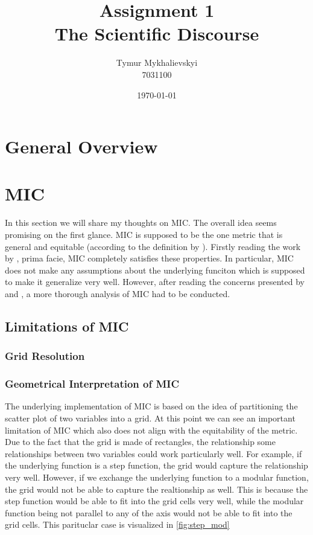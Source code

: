 \documentclass{article}
\title{\vspace{-2cm}Assignment 1\\
    The Scientific Discourse}
\author{Tymur Mykhalievskyi\\ 7031100}
\date{\today}
\begin{document}
\maketitle

\section{General Overview}


\section{MIC}
In this section we will share my thoughts on MIC. The overall idea seems promising on the first glance. MIC is supposed to be the one metric that is general and equitable (according to the definition by \cite{reshef2011}). Firstly reading the work by \cite{reshef2011}, prima facie, MIC completely satisfies these properties. In particular, MIC does not make any assumptions about the underlying funciton which is supposed to make it generalize very well. However, after reading the concerns presented by \cite{simon2014} and \cite{kinney2014}, a more thorough analysis of MIC had to be conducted.

\subsection{Limitations of MIC}

\subsubsection{Grid Resolution}

\subsubsection{Geometrical Interpretation of MIC}
The underlying implementation of MIC is based on the idea of partitioning the scatter plot of two variables into a grid. At this point we can see an important limitation of MIC which also does not align with the equitability of the metric. Due to the fact that the grid is made of rectangles, the relationship some relationships between two variables could work particularly well. For example, if the underlying function is a step function, the grid would capture the relationship very well. However, if we exchange the underlying function to a modular function, the grid would not be able to capture the realtionship as well. This is because the step function would be able to fit into the grid cells very well, while the modular function being not parallel to any of the axis would not be able to fit into the grid cells. This parituclar case is visualized in \autoref{fig:step_mod}
\end{document}

